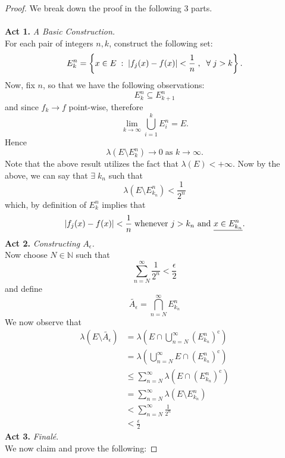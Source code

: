 \documentclass{article}
\theoremstyle{definition}
\theoremstyle{remark}
\theoremstyle{definition}
\theoremstyle{definition}
\theoremstyle{definition}
\DeclarePairedDelimiter\abs{\lvert}{\rvert}
\newcommand{\intrs}{\cap}
\newcommand{\bunion}{\bigcup}
\newcommand{\bintrs}{\bigcap}
\newcommand{\N}{\mathbb{N}}
\newcommand{\comp}[1]{#1^{\text{c}}}
\newcommand{\lm}[1]{\lambda\left (#1\right )}
\begin{document}
\begin{proof} We break down the proof in the following 3 parts.\\\\
	\textbf{Act 1.} \emph{A Basic Construction.}\\
	 For each pair of integers $ n,k $, construct the following set:
	\[E^{n}_k = \left \{x\in E\;:\; \abs{f_j(x) - f(x)} < \frac{1}{n}\;,\;\;\forall\; j>k\right \}.\]
	Now, fix $ n $, so that we have the following observations:
	\begin{equation}
		\label{T-3.1}
		E_k^{n} \subseteq E_{k+1}^{n}
	\end{equation}
	and since $ f_k \longrightarrow  f$ point-wise, therefore 
\begin{equation}
	\label{T-3.2}
	\lim_{k\to \infty}\bunion_{i=1}^{k}E_i^{n} = E.
\end{equation}
Hence 
\[\lm{E\setminus E_k^{n}} \longrightarrow 0 \;\text{as } k\to \infty.\]
Note that the above result utilizes the fact that $ \lm{E} < +\infty $. Now by the above, we can say that $ \exists\; k_n $ such that 
\[\lm{E\setminus E_{k_n}^{n}} < \frac{1}{2^n}\]
which, by definition of $ E_k^{n} $ implies that 
\[\abs{f_j(x) - f(x)} < \frac{1}{n}\;\text{whenever }j> k_n\text{ and } \underline{x\in E^{n}_{k_n}}.\]
\textbf{Act 2.} \emph{Constructing $ A_\epsilon $.} \\
Now choose $ N \in \N $ such that
\[\sum_{n=N}^{\infty} \frac{1}{2^n} < \frac{\epsilon}{2}\]
and define
\begin{equation}
	\tilde{A_\epsilon} = \bintrs_{n=N}^{\infty} E_{k_n}^{n}
\end{equation}
We now observe that
\begin{equation*}
	\begin{split}
		\lm{E\setminus \tilde{A_{\epsilon}}} &= \lm{E \intrs \bunion_{n=N}^{\infty}\comp{\left (E_{k_n}^{n}\right )}}\\
		&= \lm{ \bunion_{n=N}^{\infty}E \intrs \comp{\left (E_{k_n}^{n}\right )}}\\
		&\le \sum_{n=N}^{\infty} \lm{E\intrs \comp{\left (E_{k_n}^{n}\right )}}\\
		&= \sum_{n=N}^{\infty} \lm{E\setminus E_{k_n}^{n}}\\
		&<\sum_{n=N}^{\infty} \frac{1}{2^n}\\
		&< \frac{\epsilon}{2}
	\end{split}
\end{equation*}
\textbf{Act 3.} \emph{Final\'e}.\\
We now claim and prove the following: 

\end{proof}
\end{document}
